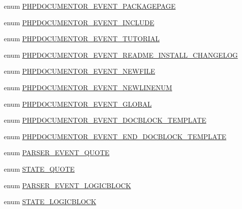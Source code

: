 \begin{DoxyCompactItemize}
enum \hyperlink{_parser_8inc_a0a638ceb422a4f92e9a79a98facc719c}{\-P\-H\-P\-D\-O\-C\-U\-M\-E\-N\-T\-O\-R\-\_\-\-E\-V\-E\-N\-T\-\_\-\-P\-A\-C\-K\-A\-G\-E\-P\-A\-G\-E} 
\item 
enum \hyperlink{_parser_8inc_ae72161dd76387e65108ad8c67b1afcfb}{\-P\-H\-P\-D\-O\-C\-U\-M\-E\-N\-T\-O\-R\-\_\-\-E\-V\-E\-N\-T\-\_\-\-I\-N\-C\-L\-U\-D\-E} 
\item 
enum \hyperlink{_parser_8inc_ab53b000cf80aea41493ffdf21a7e7fbc}{\-P\-H\-P\-D\-O\-C\-U\-M\-E\-N\-T\-O\-R\-\_\-\-E\-V\-E\-N\-T\-\_\-\-T\-U\-T\-O\-R\-I\-A\-L} 
\item 
enum \hyperlink{_parser_8inc_a35e8a5ec014c4cc5cd48b346456477e7}{\-P\-H\-P\-D\-O\-C\-U\-M\-E\-N\-T\-O\-R\-\_\-\-E\-V\-E\-N\-T\-\_\-\-R\-E\-A\-D\-M\-E\-\_\-\-I\-N\-S\-T\-A\-L\-L\-\_\-\-C\-H\-A\-N\-G\-E\-L\-O\-G} 
\item 
enum \hyperlink{_parser_8inc_ac5214db94d1e2b9c00424e952f6276fe}{\-P\-H\-P\-D\-O\-C\-U\-M\-E\-N\-T\-O\-R\-\_\-\-E\-V\-E\-N\-T\-\_\-\-N\-E\-W\-F\-I\-L\-E} 
\item 
enum \hyperlink{_parser_8inc_aea81eefb5f6e667baa7e8a1b2f27238a}{\-P\-H\-P\-D\-O\-C\-U\-M\-E\-N\-T\-O\-R\-\_\-\-E\-V\-E\-N\-T\-\_\-\-N\-E\-W\-L\-I\-N\-E\-N\-U\-M} 
\item 
enum \hyperlink{_parser_8inc_afb6faab4fe3ca5e3bdda20f5b0d7e8f3}{\-P\-H\-P\-D\-O\-C\-U\-M\-E\-N\-T\-O\-R\-\_\-\-E\-V\-E\-N\-T\-\_\-\-G\-L\-O\-B\-A\-L} 
\item 
enum \hyperlink{_parser_8inc_ae1a46d4a64efb75d1c63be962cd5634d}{\-P\-H\-P\-D\-O\-C\-U\-M\-E\-N\-T\-O\-R\-\_\-\-E\-V\-E\-N\-T\-\_\-\-D\-O\-C\-B\-L\-O\-C\-K\-\_\-\-T\-E\-M\-P\-L\-A\-T\-E} 
\item 
enum \hyperlink{_parser_8inc_a8c511c405d3dbf38860f901850231062}{\-P\-H\-P\-D\-O\-C\-U\-M\-E\-N\-T\-O\-R\-\_\-\-E\-V\-E\-N\-T\-\_\-\-E\-N\-D\-\_\-\-D\-O\-C\-B\-L\-O\-C\-K\-\_\-\-T\-E\-M\-P\-L\-A\-T\-E} 
\item 
enum \hyperlink{_parser_8inc_a2b8139c345c6936b01a5fc73804520f3}{\-P\-A\-R\-S\-E\-R\-\_\-\-E\-V\-E\-N\-T\-\_\-\-Q\-U\-O\-T\-E} 
\item 
enum \hyperlink{_parser_8inc_ad599544d229dff9472abbc1824da37ae}{\-S\-T\-A\-T\-E\-\_\-\-Q\-U\-O\-T\-E} 
\item 
enum \hyperlink{_parser_8inc_a9f04d0bc7a42505813844fdc0d9f4f4d}{\-P\-A\-R\-S\-E\-R\-\_\-\-E\-V\-E\-N\-T\-\_\-\-L\-O\-G\-I\-C\-B\-L\-O\-C\-K} 
\item 
enum \hyperlink{_parser_8inc_a026a2e1b3f49607323bb9e79035d4c4c}{\-S\-T\-A\-T\-E\-\_\-\-L\-O\-G\-I\-C\-B\-L\-O\-C\-K} 
\item 

\end{DoxyCompactItemize}
